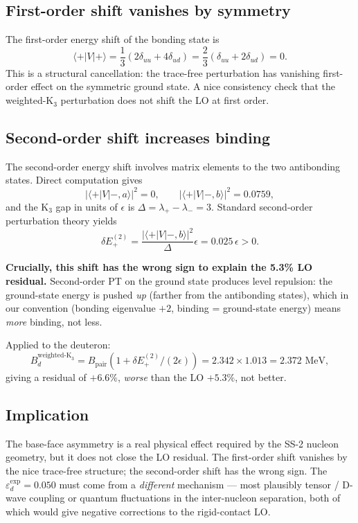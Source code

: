 \documentclass[11pt,letterpaper]{article}
\newcommand{\Bpair}{B_{\mathrm{pair}}}
\newcommand{\Bd}{B_{d}}
\newcommand{\epsd}{\varepsilon_{d}}
\begin{document}
\subsection{First-order shift vanishes by symmetry}

The first-order energy shift of the bonding state is
\[
\langle +| V | + \rangle = \frac{1}{3}(2\delta_{uu} + 4\delta_{ud}) = \frac{2}{3}(\delta_{uu} + 2\delta_{ud}) = 0.
\]
This is a structural cancellation: the trace-free perturbation has vanishing first-order effect on the symmetric ground state. A nice consistency check that the weighted-K$_3$ perturbation does not shift the LO at first order.

\subsection{Second-order shift increases binding}

The second-order energy shift involves matrix elements to the two antibonding states. Direct computation gives
\[
|\langle +| V | -, a \rangle|^2 = 0, \qquad |\langle +| V | -, b \rangle|^2 = 0.0759,
\]
and the K$_3$ gap in units of $\epsilon$ is $\Delta = \lambda_+ - \lambda_- = 3$. Standard second-order perturbation theory yields
\[
\delta E^{(2)}_+ = \frac{|\langle +| V | -, b \rangle|^2}{\Delta} \epsilon = 0.025 \, \epsilon > 0.
\]

\textbf{Crucially, this shift has the wrong sign to explain the 5.3\% LO residual.} Second-order PT on the ground state produces level repulsion: the ground-state energy is pushed \emph{up} (farther from the antibonding states), which in our convention (bonding eigenvalue $+2$, binding = ground-state energy) means \emph{more} binding, not less.

Applied to the deuteron:
\[
\Bd^{\text{weighted-K}_3} = \Bpair (1 + \delta E^{(2)}_+ / (2\epsilon)) = 2.342 \times 1.013 = 2.372 \text{ MeV},
\]
giving a residual of $+6.6\%$, \emph{worse} than the LO $+5.3\%$, not better.

\subsection{Implication}

The base-face asymmetry is a real physical effect required by the SS-2 nucleon geometry, but it does not close the LO residual. The first-order shift vanishes by the nice trace-free structure; the second-order shift has the wrong sign. The $\epsd^{\mathrm{exp}} = 0.050$ must come from a \emph{different} mechanism --- most plausibly tensor / D-wave coupling or quantum fluctuations in the inter-nucleon separation, both of which would give negative corrections to the rigid-contact LO.
\end{document}
